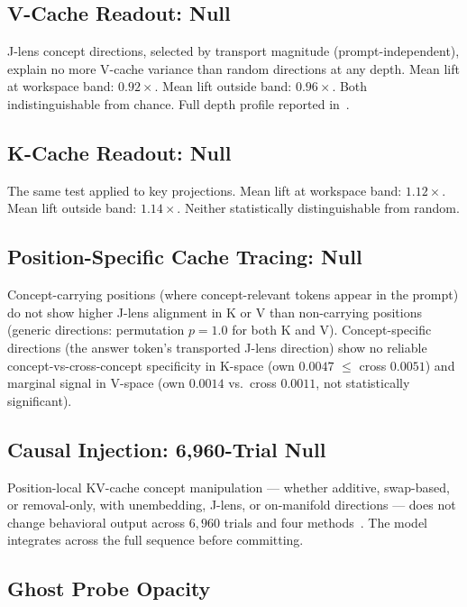 \documentclass[11pt,a4paper]{article}
\begin{document}
\subsection{V-Cache Readout: Null}

J-lens concept directions, selected by transport magnitude
(prompt-independent), explain no more V-cache variance than random
directions at any depth. Mean lift at workspace band: $0.92\times$.
Mean lift outside band: $0.96\times$. Both indistinguishable from
chance. Full depth profile reported in~\citep{lyra2026cache_tracing}.

\subsection{K-Cache Readout: Null}

The same test applied to key projections. Mean lift at workspace band:
$1.12\times$. Mean lift outside band: $1.14\times$. Neither
statistically distinguishable from random.

\subsection{Position-Specific Cache Tracing: Null}

Concept-carrying positions (where concept-relevant tokens appear in
the prompt) do not show higher J-lens alignment in K or V than
non-carrying positions (generic directions: permutation $p{=}1.0$
for both K and V). Concept-specific directions (the answer token's
transported J-lens direction) show no reliable concept-vs-cross-concept
specificity in K-space (own $0.0047$ $\leq$ cross $0.0051$) and
marginal signal in V-space (own $0.0014$ vs.\ cross $0.0011$, not
statistically significant).

\subsection{Causal Injection: 6,960-Trial Null}

Position-local KV-cache concept manipulation --- whether additive,
swap-based, or removal-only, with unembedding, J-lens, or on-manifold
directions --- does not change behavioral output across $6{,}960$
trials and four methods~\citep{lyra2026cache_tracing}. The model
integrates across the full sequence before committing.

\subsection{Ghost Probe Opacity}
\end{document}
